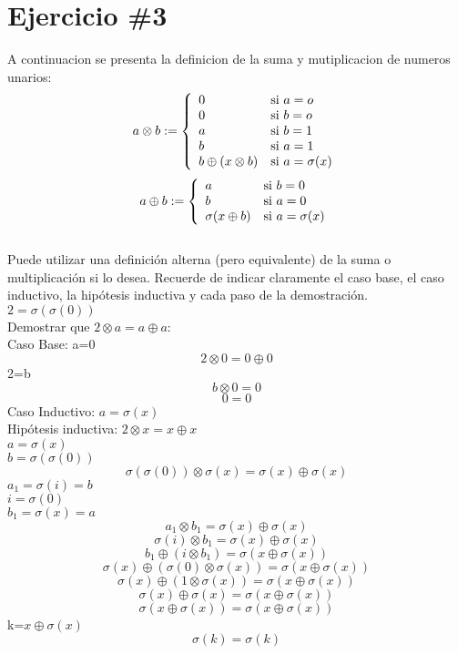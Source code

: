 \documentclass{article}
\begin{document}
\section*{Ejercicio \#3}
A continuacion se presenta la definicion de la suma y mutiplicacion de numeros unarios:
\[
        a\otimes b := \left\{
        \begin{array}{l l}
            0 & \mbox{si } a=o \\
            0 & \mbox{si } b=o \\
            a & \mbox{si } b=1 \\
            b & \mbox{si } a=1 \\
            b\oplus(x\otimes b) & \mbox{si } a=\sigma(x) \\
        \end{array}
        \right.
    \]
\[
        a\oplus b := \left\{
        \begin{array}{l l}
            a & \mbox{si } b=0 \\
            b & \mbox{si } a=0 \\
            \sigma (x\oplus b) & \mbox{si } a=\sigma(x) \\
        \end{array}
        \right.
    \]\\
Puede utilizar una definición alterna (pero equivalente) de la suma o multiplicación si lo desea. Recuerde de indicar claramente el caso base, el caso inductivo, la hipótesis inductiva y cada paso de la demostración.\\
$2=\sigma ( \sigma(0))$\\
Demostrar que $2\otimes a=a\oplus a$:\\
Caso Base: a=0\\
\[2\otimes 0 = 0\oplus 0 \]
2=b
\[b\otimes 0 = 0 \]
\[0 = 0 \]
Caso Inductivo: $a=\sigma(x)$\\
Hipótesis inductiva: $2\otimes x= x\oplus x$\\
 $a=\sigma(x)$\\
$b=\sigma(\sigma(0))$\\
\[\sigma(\sigma(0))\otimes \sigma(x) = \sigma(x) \oplus \sigma(x)\]
$a_1=\sigma(i)=b$\\
$i=\sigma(0)$\\
$b_1=\sigma(x)=a$\\
\[a_1 \otimes b_1 = \sigma(x) \oplus \sigma(x)\]
\[\sigma(i) \otimes b_1 = \sigma(x) \oplus \sigma(x)\]
\[b_1\oplus (i\otimes b_1) = \sigma(x \oplus \sigma(x))\]
\[\sigma(x)\oplus (\sigma(0)\otimes \sigma(x)) = \sigma(x \oplus \sigma(x))\]
\[\sigma(x)\oplus (1\otimes \sigma(x)) = \sigma(x \oplus \sigma(x))\]
\[\sigma(x)\oplus \sigma(x) = \sigma(x \oplus \sigma(x))\]
\[\sigma(x\oplus \sigma(x)) = \sigma(x \oplus \sigma(x))\]
k=$x\oplus \sigma(x)$
\[\sigma(k) = \sigma(k)\]
\end{document}
